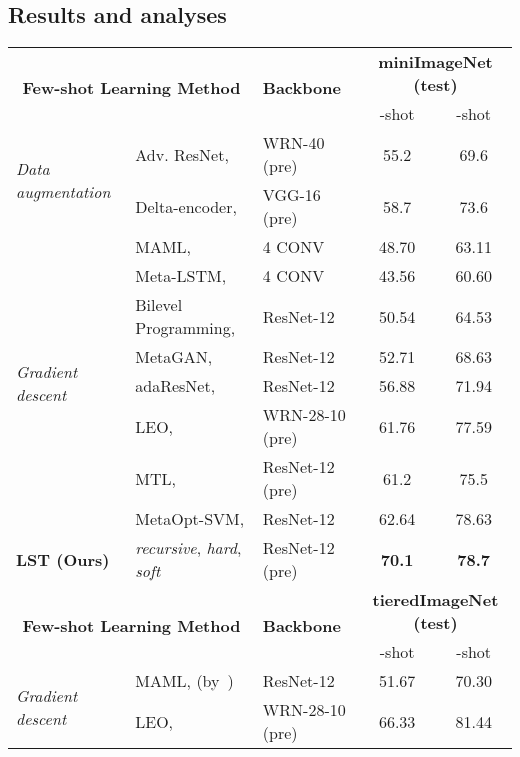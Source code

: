 \documentclass{article}
\begin{document}
\subsection{Results and analyses}
\begin{table*}
  \small
  \centering
  \begin{tabular}{l l lcc}
    \toprule
     \multicolumn{2}{c}{\multirow{2}{*}{\textbf{Few-shot Learning Method}}} & \multirow{2}{*}{\textbf{Backbone}} &  \multicolumn{2}{c}{\textbf{miniImageNet (test)}} \\
     &&& -shot & -shot \\
    \midrule
    \multirow{2}{*}{\emph{Data augmentation}}
    & Adv. ResNet, \cite{Mehrotra2017} & WRN-40 (pre) & 55.2 & 69.6 \\
    & Delta-encoder, \cite{SchwartzNIPS18} & VGG-16 (pre) & 58.7 & 73.6 \\
    \midrule  
    \multirow{8}{*}{\emph{Gradient descent}}
    & MAML, \cite{FinnAL17} & 4 CONV & 48.70   & 63.11   \\
    & Meta-LSTM, \cite{RaviICLR2017} & 4 CONV & 43.56   & 60.60   \\
    & Bilevel Programming, \cite{FranceschiICML18} & ResNet-12   & 50.54    & 64.53  \\
    & MetaGAN, \cite{ZhangNIPS2018MetaGAN} & ResNet-12 & 52.71    & 68.63   \\
    & adaResNet, \cite{MunkhdalaiICML18} & ResNet-12   & 56.88   & 71.94   \\
    & LEO, \cite{RusuICLR2019} & WRN-28-10 (pre) & 61.76   & 77.59   \\
    & MTL, \cite{SunCVPR2019} & ResNet-12 (pre) & 61.2    & 75.5   \\
    & MetaOpt-SVM, \cite{LeeCVPR19svm} & ResNet-12 & 62.64    & 78.63   \\
    \midrule
\textbf{LST (Ours)} & \emph{recursive}, \emph{hard}, \emph{soft} & ResNet-12 (pre) & \textbf{70.1}    & \textbf{78.7}    \\
    \midrule\midrule
    \multicolumn{2}{c}{\multirow{2}{*}{\textbf{Few-shot Learning Method}}} & \multirow{2}{*}{\textbf{Backbone}} &  \multicolumn{2}{c}{\textbf{tieredImageNet (test)}} \\
     &&& -shot & -shot \\
    \midrule
\multirow{4}{*}{\emph{Gradient descent}}
    & MAML, \cite{FinnAL17} (by~\cite{LiuICLR2019transductive}) & ResNet-12 & 51.67   & 70.30   \\
    & LEO, \cite{RusuICLR2019} & WRN-28-10 (pre) & 66.33   & 81.44   \\

\end{tabular}
\end{table*}
\end{document}
